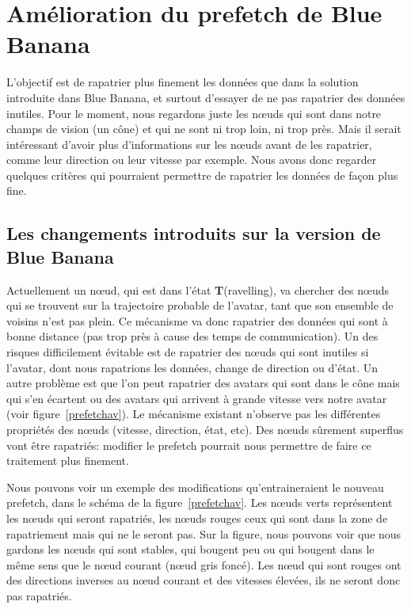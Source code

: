 \section{Amélioration du prefetch de Blue Banana}

L'objectif  est de rapatrier plus finement les données que dans la solution introduite dans Blue Banana, et surtout d'essayer de ne pas rapatrier des données inutiles. Pour le moment, nous regardons juste les nœuds qui sont dans notre champs de vision (un cône) et qui ne sont ni trop loin, ni trop près. Mais il serait intéressant d'avoir plus d'informations sur les nœuds avant de les rapatrier, comme leur direction ou leur vitesse par exemple. Nous avons donc regarder quelques critères qui pourraient permettre de rapatrier les données de façon plus fine.

\subsection{Les changements introduits sur la version de Blue Banana}


\par Actuellement un nœud, qui est dans l'état \textbf{T}(ravelling), va chercher des nœuds qui se trouvent sur la trajectoire probable de l'avatar, tant que son ensemble de voisins n'est pas plein. Ce mécanisme va donc rapatrier des données qui sont à bonne distance (pas trop près à cause des temps de communication). Un des risques difficilement évitable est de rapatrier des nœuds qui sont inutiles si l'avatar, dont nous rapatrions les données, change de direction ou d'état. Un autre problème est que l'on peut rapatrier des avatars qui sont dans le cône mais qui s'en écartent ou des avatars qui arrivent à grande vitesse vers notre avatar (voir figure~\ref{prefetchav}). Le mécanisme existant n'observe pas les différentes propriétés des nœuds (vitesse, direction, état, etc). Des nœuds sûrement superflus vont être rapatriés: modifier le prefetch pourrait nous permettre de faire ce traitement plus finement.

\par  Nous pouvons voir un exemple des modifications qu'entraineraient le nouveau prefetch, dans le schéma de la figure~\ref{prefetchav}. Les nœuds verts représentent les nœuds qui seront rapatriés, les nœuds rouges ceux qui sont dans la zone de rapatriement mais qui ne le seront pas. Sur la figure, nous pouvons voir que nous gardons les nœuds qui sont stables, qui bougent peu ou qui bougent dans le même sens que le nœud courant (nœud gris foncé). Les nœud qui sont rouges ont des directions inverses au nœud courant et des vitesses élevées, ils ne seront donc pas rapatriés.


